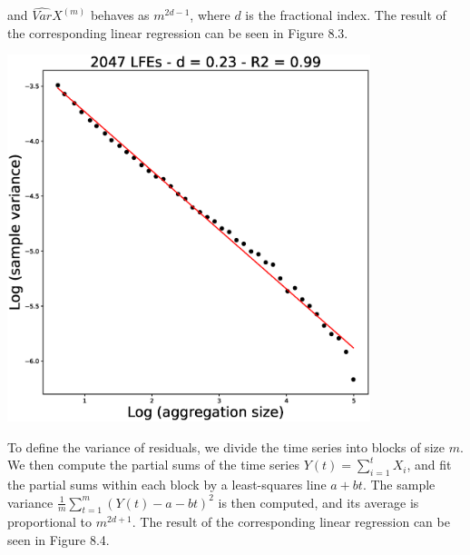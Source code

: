 \documentclass[methods.tex]{subfiles}
\begin{document}
and $\hat{Var} X^{\left( m \right)}$ behaves as $m^{2 d - 1}$, where $d$ is the fractional index. The result of the corresponding linear regression can be seen in Figure 8.3.

\begin{center}
\includegraphics[width=300pt, trim={0cm 0cm 0cm 0cm},clip]{Figures/longrange/variance.eps}
\captionsetup{type=figure}
\end{center}

To define the variance of residuals, we divide the time series into blocks of size $m$. We then compute the partial sums of the time series $Y \left( t \right) = \sum_{i = 1}^{t} X_i$, and fit the partial sums within each block by a least-squares line $a + b t$. The sample variance $\frac{1}{m} \sum_{t = 1}^{m} \left( Y \left( t \right) - a - b t \right) ^2$ is then computed, and its average is proportional to $m^{2 d + 1}$. The result of the corresponding linear regression can be seen in Figure 8.4.
\end{document}
